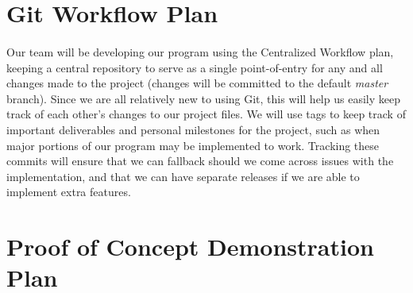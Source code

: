 \documentclass{article}
\begin{document}
\section{Git Workflow Plan}

\paragraph{}
Our team will be developing our program using the Centralized Workflow plan, keeping a central repository to serve as a single point-of-entry for any and all changes made to the project (changes will be committed to the default \textit{master} branch). Since we are all relatively new to using Git, this will help us easily keep track of each other's changes to our project files. We will use tags to keep track of important deliverables and personal milestones for the project, such as when major portions of our program may be implemented to work. Tracking these commits will ensure that we can fallback should we come across issues with the implementation, and that we can have separate releases if we are able to implement extra features.

\section{Proof of Concept Demonstration Plan}
\end{document}
